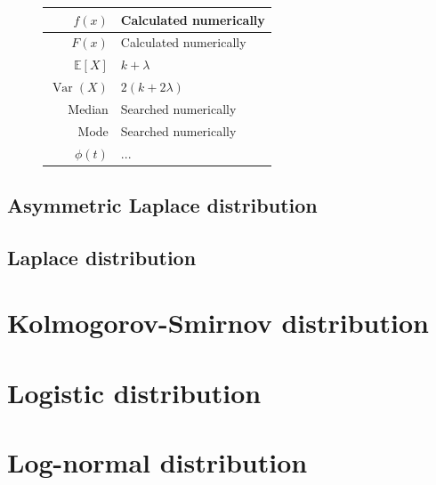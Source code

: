 \documentclass[a4paper,11pt]{article}
\theoremstyle{plain}
\theoremstyle{definition}
\newcommand{\ME}{\mathbb{E}}
\newcommand{\Var}{\operatorname{Var}}
\begin{document}
\begin{figure}[!htb]
\begin{minipage}{0.4\textwidth}
\begin{tabular}{| r | l |}
				\hline
				$f(x)$ & Calculated numerically \\
				\hline
				$F(x)$ & Calculated numerically \\
				\hline
				$\ME[X]$ & $ k + \lambda$ \\
				\hline
				$\Var(X)$ & $2(k+2\lambda)$ \\
				\hline
				Median & Searched numerically \\
				\hline
				Mode & Searched numerically \\
				\hline
				$\phi(t)$ & $ ...$ \\
				\hline
			\end{tabular}
		\end{minipage}
	\end{figure}
	
	\subsection{Asymmetric Laplace distribution}

	\subsection{Laplace distribution}
	
	\pagebreak
	\section{Kolmogorov-Smirnov distribution}
	\pagebreak
	\section{Logistic distribution}
	\pagebreak
	\section{Log-normal distribution}
	\pagebreak
\end{document}

